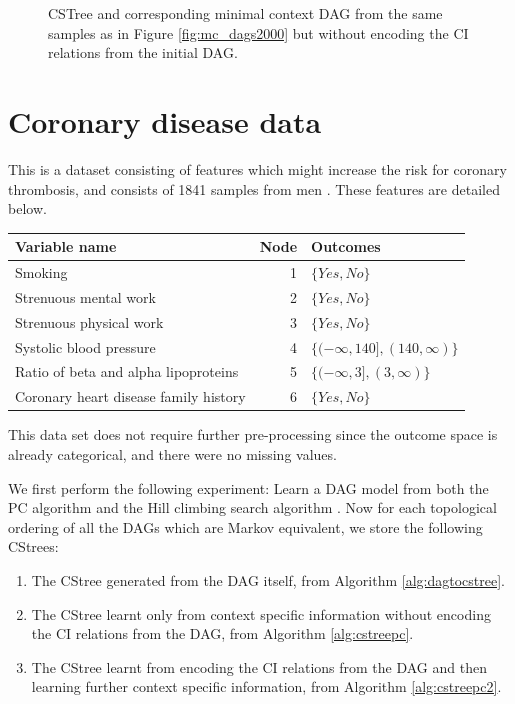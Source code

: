 \documentclass{tufte-book}
\begin{document}
\begin{figure}[!h]\label{fig:mcdags_csi}
   \begin{floatrow}
%
 \caption{CSTree and corresponding minimal context DAG from the same samples as in Figure \ref{fig:mc_dags2000} but without encoding the CI relations from the initial DAG.}
        
   \end{floatrow}
\end{figure}

 \newpage 
\section{Coronary disease data}
\label{sec:orgd6599d4}

This is a dataset consisting of features which might increase the risk for coronary thrombosis, and consists of 1841 samples from men \cite{reinis-1981-progn-signif}.  These features are detailed below.
\begin{center}
\begin{tabular}{l|r|l}
\hline
Variable name & Node & Outcomes\\
\hline
Smoking & 1 & \(\{ Yes,No \}\)\\
Strenuous mental work & 2 & \(\{ Yes,No \}\)\\
Strenuous physical work & 3 & \(\{ Yes,No \}\)\\
Systolic blood pressure & 4 & \(\{(-\infty,140],(140,\infty)\}\)\\
Ratio of beta and alpha lipoproteins & 5 & \(\{(-\infty,3],(3,\infty)\}\)\\
Coronary heart disease family history & 6 & \(\{ Yes,No \}\)\\
\end{tabular}
\end{center}


This data set does not require further pre-processing since the outcome space is already categorical, and there were no missing values.


We first perform the following experiment: Learn a DAG model from both the PC algorithm and the Hill climbing search algorithm \cite{koller-2009-probab,ankan-2015} . Now for each topological ordering of all the DAGs which are Markov equivalent, we store the following CStrees:
\begin{enumerate}
\item The CStree generated from the DAG itself, from Algorithm \ref{alg:dagtocstree}.
\item The CStree learnt only from context specific information without encoding the CI relations from the DAG, from Algorithm \ref{alg:cstreepc}.
\item The CStree learnt from encoding the CI relations from the DAG and then learning further context specific information, from Algorithm \ref{alg:cstreepc2}.
\end{enumerate}
\end{document}

